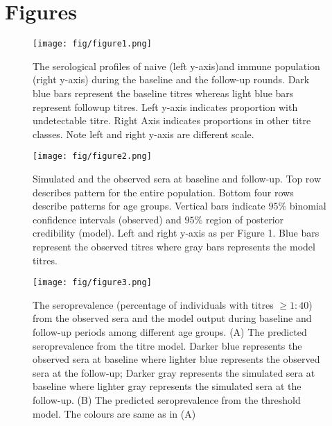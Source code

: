 \documentclass{article}
\begin{document}
\section{Figures}
\begin{figure}[h!] %
      \centering
              \texttt{[image: fig/figure1.png]}
              \caption{The serological profiles of naive (left y-axis)and immune population (right y-axis) during the baseline and the follow-up rounds. Dark blue bars represent the baseline titres whereas light blue bars represent followup titres. Left y-axis indicates proportion with undetectable titre. Right Axis indicates proportions in other titre classes. Note left and right y-axis are different scale.}
\end{figure}
\clearpage

\begin{figure}[h!]
      \texttt{[image: fig/figure2.png]}
      \caption{Simulated and the observed sera at baseline and follow-up. Top row describes pattern for the entire population. Bottom four rows describe patterns for age groups. Vertical bars indicate $95\%$ binomial confidence intervals (observed) and $95\%$ region of posterior credibility (model). Left and right y-axis as per Figure 1. Blue bars represent the observed titres where gray bars represents the model titres.}
\end{figure}

\begin{figure}[h!]
      \texttt{[image: fig/figure3.png]}
      \caption{The seroprevalence (percentage of individuals with titres  $\geq 1:40 $) from the observed sera and the model output during baseline and follow-up periods among different age groups. (A) The predicted seroprevalence from the titre model. Darker blue represents the observed sera at baseline where lighter blue represents the observed sera at the follow-up; Darker gray represents the simulated sera at baseline where lighter gray represents the simulated sera at the follow-up. (B) The predicted seroprevalence from the threshold model. The colours are same as in (A)}
\end{figure}
\end{document}
